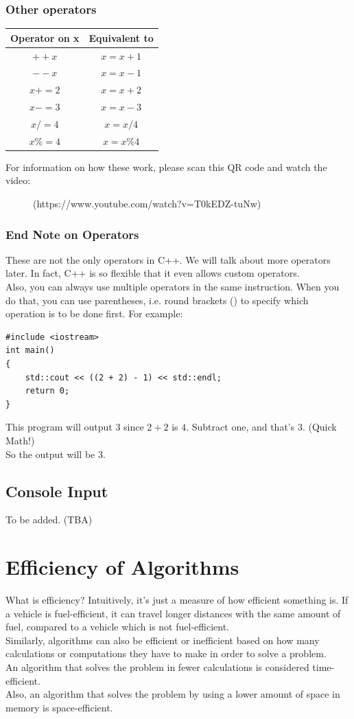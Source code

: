 \documentclass[letterpaper, 12pt]{book}
\begin{document}
\subsection{Other operators}
\begin{center}
	\begin{tabular}{ |c|c| } 
		\hline
		Operator on x & Equivalent to\\
		\hline
		$++x$ & $x = x + 1$\\
		$--x$ & $x = x - 1$\\
		$x += 2$ & $x = x + 2$\\
		$x -= 3$ & $x = x - 3$\\
		$x /= 4$ & $x = x / 4$\\
		$x \%= 4$& $x = x \% 4$\\
		\hline
	\end{tabular}
\end{center}
For information on how these work, please scan this QR code and watch the video:\\
\begin{figure}[h]
\centering
{}
\caption{(https://www.youtube.com/watch?v=T0kEDZ-tuNw)}
\end{figure}
\subsection{End Note on Operators}
These are not the only operators in C++. We will talk about more operators later. In fact, C++ is so flexible that it even allows custom operators.\\
Also, you can always use multiple operators in the same instruction. When you do that, you can use parentheses, i.e. round brackets () to specify which operation is to be done first. For example:
\begin{lstlisting}
#include <iostream>
int main()
{
	std::cout << ((2 + 2) - 1) << std::endl;
	return 0;
}
\end{lstlisting}
This program will output 3 since $2 + 2$ is $4$. Subtract one, and that's $3$. (Quick Math!)\\
So the output will be 3.
\section{Console Input}
To be added. (TBA)
\chapter{Efficiency of Algorithms}
What is efficiency? Intuitively, it's just a measure of how efficient something is. If a vehicle is fuel-efficient, it can travel longer distances with the same amount of fuel, compared to a vehicle which is not fuel-efficient.\\
Similarly, algorithms can also be efficient or inefficient based on how many calculations or computations they have to make in order to solve a problem.\\
An algorithm that solves the problem in fewer calculations is considered time-efficient.\\
Also, an algorithm that solves the problem by using a lower amount of space in memory is space-efficient.
\end{document}
